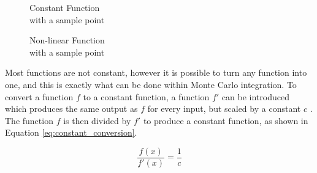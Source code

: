 \documentclass[ %
                    author={Callum Pearce},
                supervisor={Dr. Neill Campbell},
                    degree={MEng},
                     title={How effective are Temporal difference learning methods for reducing the number of zero contribution light paths, while still accurately approximating Global Illumination in Path tracing?},
                  subtitle={},
                      type={research},
                      year={2019} ]{dissertation}
\begin{document}
\begin{figure}[h]
\captionsetup{justification=centering}
\centering
\begin{minipage}{.33\textwidth}
    \hspace*{\fill}%
     \caption{Constant Function\\ with a sample point}
  \label{fig:constant_function}
\end{minipage}
\hspace{8em}
\begin{minipage}{.33\textwidth}
    
  \hspace*{\fill}%

  \caption{ Non-linear Function\\ with a sample point}
  \label{fig:non_lin_function}
\end{minipage}
\end{figure}

Most functions are not constant, however it is possible to turn any function into one, and this is exactly what can be done within Monte Carlo integration. To convert a function $f$ to a constant function, a function $f'$ can be introduced which produces the same output as $f$ for every input, but scaled by a constant $c$ \cite{scratchapixel_2015}. The function $f$ is then divided by $f'$ to produce a constant function, as shown in Equation \ref{eq:constant_conversion}.

\begin{equation}
\label{eq:constant_conversion}
\frac{f(x)}{f'(x)} = \frac{1}{c}
\end{equation}
\end{document}
